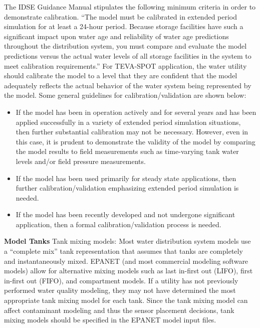The IDSE Guidance Manual stipulates the following minimum criteria in order to demonstrate calibration. ``The model must be calibrated in extended period simulation for at least a 24-hour period. Because storage facilities have such a significant impact upon water age and reliability of water age predictions throughout the distribution system, you must compare and evaluate the model predictions versus the actual water levels of all storage facilities in the system to meet calibration requirements.'' For TEVA-SPOT application, the water utility should calibrate the model to a level that they are confident that the model adequately reflects the actual behavior of the water system being represented by the model.  Some general guidelines for calibration/validation are shown below:
\begin{itemize} 
\item If the model has been in operation actively and for several years and has been applied successfully in a variety of extended period simulation situations, then further substantial calibration may not be necessary. However, even in this case,  it is prudent to demonstrate the validity of the model by comparing the model results to field measurements such as time-varying tank water levels and/or field pressure measurements.
\item If the model has been used primarily for steady state applications, then further calibration/validation emphasizing extended period simulation is needed.
\item If the model has been recently developed and not undergone significant application, then a formal calibration/validation process is needed.
\end{itemize}

{\bf Model Tanks}
Tank mixing models:  Most water distribution system models use a ``complete mix'' tank representation that assumes that tanks are completely and instantaneously mixed. EPANET (and most commercial modeling software models) allow for alternative mixing models such as last in-first out (LIFO), first in-first out (FIFO), and compartment models.  If a utility has not previously performed water quality modeling, they may not have determined the most appropriate tank mixing model for each tank. Since the tank mixing model can affect contaminant modeling and thus the sensor placement decisions, tank mixing models should be specified in the EPANET model input files.

